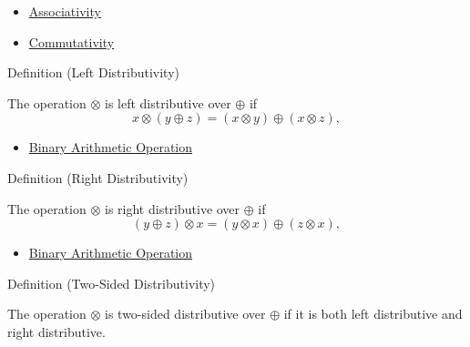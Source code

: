 \begin{dependencies}
\begin{itemize}
  \item \hyperref[def:associativity]{Associativity}
  \item \hyperref[def:commutativity]{Commutativity}
\end{itemize}
\end{dependencies}

\begin{definitionbox}{Definition (Left Distributivity)}
\begin{definition}
\label{def:left-distributivity}
The operation $\otimes$ is left distributive over $\oplus$ if
\[
x\otimes(y\oplus z)=(x\otimes y)\oplus(x\otimes z),
\]
\end{definition}
\end{definitionbox}

\begin{dependencies}
\begin{itemize}
  \item \hyperref[def:binary-arithmetic-operation]{Binary Arithmetic Operation}
\end{itemize}
\end{dependencies}

\begin{definitionbox}{Definition (Right Distributivity)}
\begin{definition}
\label{def:right-distributivity}
The operation $\otimes$ is right distributive over $\oplus$ if
\[
(y\oplus z)\otimes x=(y\otimes x)\oplus(z\otimes x),
\]
\end{definition}
\end{definitionbox}

\begin{dependencies}
\begin{itemize}
  \item \hyperref[def:binary-arithmetic-operation]{Binary Arithmetic Operation}
\end{itemize}
\end{dependencies}

\begin{definitionbox}{Definition (Two-Sided Distributivity)}
\begin{definition}
\label{def:two-sided-distributivity}
The operation $\otimes$ is two-sided distributive over $\oplus$ if it is both
left distributive and right distributive.
\end{definition}
\end{definitionbox}

